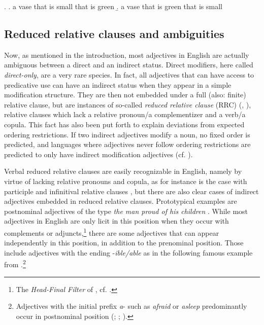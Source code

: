\documentclass [output=book,colorlinks,citecolor=brown]{langscibook}
\begin{document}
\ex. \label{bigredrc} \a. a vase that is small that is green
\b. a vase that is green that is small

\subsection{Reduced relative clauses and ambiguities} \label{ambiguities}

Now, as mentioned in the introduction, most adjectives in English are actually ambiguous between a direct and an indirect status. Direct modifiers, here called \textit{direct-only}, are a very rare species. In fact, all adjectives that can have access to predicative use can have an indirect status when they appear in a simple modification structure. They are then not embedded under a full (also: finite) relative clause, but are instances of so-called \textit{reduced relative clause} (RRC) (\citealt[54–55]{cinque:2010:adj}, \citealt{douglas:2016:syntactic, harwood:2018:rrc}), relative clauses which lack a relative pronoun/a complementizer and a verb/a copula. This fact has also been put forth to explain deviations from expected ordering restrictions. If two indirect adjectives modify a noun, no fixed order is predicted, and languages where adjectives never follow ordering restrictions are predicted to only have indirect modification adjectives (cf. \citealt[ch. 3.3.2]{cinque:2010:adj}).

Verbal reduced relative clauses are easily recognizable in English, namely by virtue of lacking relative pronouns and copula, as for instance is the case with participle and infinitival relative clauses \citep{kayne:1994:anti, cinque:2020:relcl}, but there are also clear cases of indirect adjectives embedded in reduced relative clauses. Prototypical examples are postnominal adjectives of the type \textit{the man proud of his children} \citep{williams:1982:fofc, kayne:1994:anti, sadler:1994:prenominal, larson:2000:acd, larson:2004:indefinite}. While most adjectives in English are only licit in this position when they occur with complements or adjuncts,\footnote{The \textit{Head-Final Filter} of \citet{williams:1982:fofc}, cf. \citet{alexeyenko:2021:hff, richards:2022:finding, richards:2023:finding}.} there are some adjectives that can appear independently in this position, in addition to the prenominal position. Those include adjectives with the ending -\textit{ible/able} as in the following famous example from \citet[3--4]{bolinger:1967:adj}.\footnote{Adjectives with the initial prefix \textit{a}- such as \textit{afraid} or \textit{asleep} predominantly occur in postnominal position (\citealt{bolinger:1967:adj, larson:1998:events, larson:2004:indefinite}; \citealt[295]{alex:2007:nounphrase}; \citealt[ch. 2.3]{belk:2017:attributes}).} %
\end{document}
